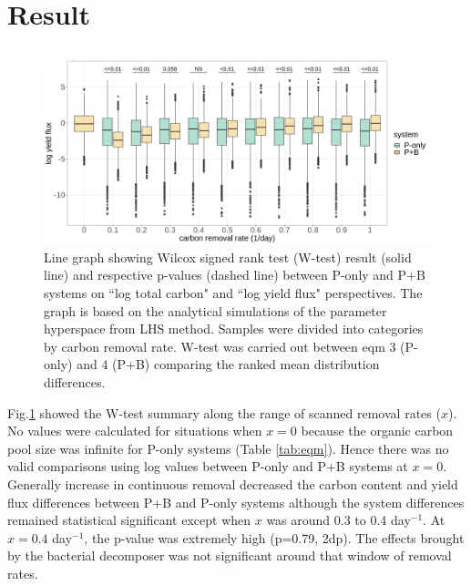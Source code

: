 \documentclass[../thesis.tex]{subfiles} %
\begin{document}
\section{Result}

\subsection{\hI} %
\begin{figure}[H]
    \centering
    \includegraphics[width=.7\linewidth]{../result/Wilcox.png}
    \caption[Wilcox test summary]{Line graph showing Wilcox signed rank test (W-test) result (solid line) and respective p-values (dashed line) between P-only and P+B systems on ``log total carbon" and ``log yield flux" perspectives.  {\scriptsize The graph is based on the analytical simulations of the parameter hyperspace from LHS method.  Samples were divided into categories by carbon removal rate.  W-test was carried out between eqm 3 (P-only) and 4 (P+B) comparing the ranked mean distribution differences.}}
    \label{fig:wilcox}
\end{figure}

Fig.\ref{fig:wilcox} showed the W-test summary along the range of scanned removal rates ($x$).  No values were calculated for situations when $x=0$ because the organic carbon pool size was infinite for P-only systems (Table \ref{tab:eqm}).  Hence there was no valid comparisons using log values between P-only and P+B systems at $x=0$.  Generally increase in continuous removal decreased the carbon content and yield flux differences between P+B and P-only systems although the system differences remained statistical significant except when $x$ was around 0.3 to 0.4 day$^{-1}$.  At $x=0.4$ day$^{-1}$, the p-value was extremely high (p=0.79, 2dp).  The effects brought by the bacterial decomposer was not significant around that window of removal rates.
\end{document}
